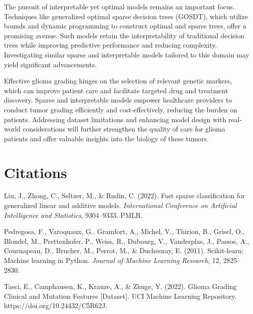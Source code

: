 \documentclass[12pt]{article}
\newtheorem{Proof of Lemma}{Proof of Lemma}
\begin{document}
The pursuit of interpretable yet optimal models remains an important focus. Techniques like generalized optimal sparse decision trees (GOSDT), which utilize bounds and dynamic programming to construct optimal and sparse trees, offer a promising avenue. Such models retain the interpretability of traditional decision trees while improving predictive performance and reducing complexity. Investigating similar sparse and interpretable models tailored to this domain may yield significant advancements.

Effective glioma grading hinges on the selection of relevant genetic markers, which can improve patient care and facilitate targeted drug and treatment discovery. Sparse and interpretable models empower healthcare providers to conduct tumor grading efficiently and cost-effectively, reducing the burden on patients. Addressing dataset limitations and enhancing model design with real-world considerations will further strengthen the quality of care for glioma patients and offer valuable insights into the biology of these tumors.


\section*{Citations}
Liu, J., Zhong, C., Seltzer, M., \& Rudin, C. (2022). Fast sparse classification for generalized linear and additive models. \textit{International Conference on Artificial Intelligence and Statistics}, 9304–9333. PMLR.

Pedregosa, F., Varoquaux, G., Gramfort, A., Michel, V., Thirion, B., Grisel, O., Blondel, M., Prettenhofer, P., Weiss, R., Dubourg, V., Vanderplas, J., Passos, A., Cournapeau, D., Brucher, M., Perrot, M., \& Duchesnay, E. (2011). Scikit-learn: Machine learning in Python. \textit{Journal of Machine Learning Research}, 12, 2825–2830.

Tasci, E., Camphausen, K., Krauze, A., \& Zhuge, Y. (2022). Glioma Grading Clinical and Mutation Features [Dataset]. UCI Machine Learning Repository. https://doi.org/10.24432/C5R62J.
\end{document}
